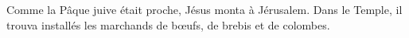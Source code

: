 Comme la Pâque juive était proche, Jésus monta à Jérusalem.
Dans le Temple, il trouva installés les marchands de bœufs,
	de brebis et de colombes.
